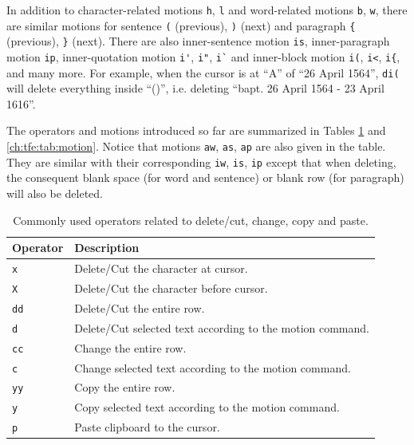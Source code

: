 In addition to character-related motions \verb|h|, \verb|l| and word-related motions  \verb|b|, \verb|w|, there are similar motions for sentence \verb|(| (previous), \verb|)| (next) and paragraph \verb|{| (previous), \verb|}| (next). There are also inner-sentence motion \verb|is|, inner-paragraph motion \verb|ip|, inner-quotation motion \verb|i'|, \verb|i"|, \verb|i`| and inner-block motion \verb|i(|, \verb|i<|, \verb|i{|, and many more. For example, when the cursor is at ``A'' of ``26 April 1564'', \verb|di(| will delete everything inside ``()'', i.e. deleting ``bapt. 26 April 1564 - 23 April 1616''.

The operators and motions introduced so far are summarized in Tables \ref{ch:tfe:tab:deletecut} and \ref{ch:tfe:tab:motion}. Notice that motions \verb|aw|, \verb|as|, \verb|ap| are also given in the table. They are similar with their corresponding \verb|iw|, \verb|is|, \verb|ip| except that when deleting, the consequent blank space (for word and sentence) or blank row (for paragraph) will also be deleted.

\begin{table}
  \centering \caption{Commonly used operators related to delete/cut, change, copy and paste.}\label{ch:tfe:tab:deletecut}
  \begin{tabularx}{\textwidth}{lX}
    \hline
    Operator & Description \\ \hline
    \verb|x| & Delete/Cut the character at cursor. \\ \hdashline
    \verb|X| & Delete/Cut the character before cursor. \\ \hdashline
    \verb|dd| & Delete/Cut the entire row. \\ \hdashline
    \verb|d| & Delete/Cut selected text according to the motion command. \\ \hdashline
    \verb|cc| & Change the entire row. \\ \hdashline
    \verb|c| & Change selected text according to the motion command. \\ \hdashline
    \verb|yy| & Copy the entire row. \\ \hdashline
    \verb|y| & Copy selected text according to the motion command. \\ \hdashline
    \verb|p| & Paste clipboard to the cursor. \\
    \hline
  \end{tabularx}
\end{table}

